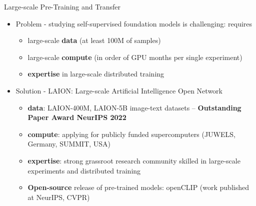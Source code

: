 \begin{frame}{Large-scale Pre-Training and Transfer}
\protect\hypertarget{large-scale-pre-training-and-transfer-13}{}
\begin{itemize}
\tightlist
\item
  Problem - studying self-supervised foundation models is challenging:
  requires

  \begin{itemize}
  \tightlist
  \item
    large-scale \textbf{data} (at least 100M of samples)
  \item
    large-scale \textbf{compute} (in order of GPU months per single
    experiment)
  \item
    \textbf{expertise} in large-scale distributed training
  \end{itemize}
\end{itemize}


\begin{itemize}
\tightlist
\item
  Solution - LAION: Large-scale Artificial Intelligence Open Network

  \begin{itemize}
  \tightlist
  \item
    \textbf{data}: LAION-400M, LAION-5B image-text datasets --
    \textbf{Outstanding Paper Award NeurIPS 2022}
  \item
    \textbf{compute}: applying for publicly funded supercomputers
    (JUWELS, Germany, SUMMIT, USA)
  \item
    \textbf{expertise}: strong grassroot research community skilled in
    large-scale experiments and distributed training
  \item
    \textbf{Open-source} release of pre-trained models: openCLIP (work
    published at NeurIPS, CVPR)
  \end{itemize}
\end{itemize}
\end{frame}

